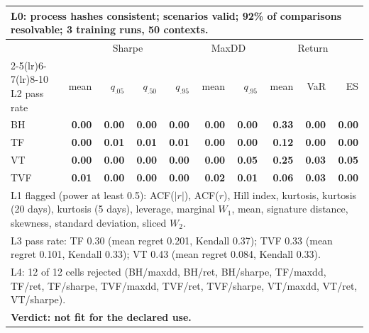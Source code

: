\begin{tabular}{lrrrrrrrrr}
\toprule
\multicolumn{10}{p{13.5cm}}{L0: process hashes consistent; scenarios valid; 92\% of comparisons resolvable; 3 training runs, 50 contexts.} \\
\midrule
 & \multicolumn{4}{c}{Sharpe} & \multicolumn{2}{c}{MaxDD} & \multicolumn{3}{c}{Return} \\
\cmidrule(lr){2-5}\cmidrule(lr){6-7}\cmidrule(lr){8-10}
L2 pass rate & mean & $q_{.05}$ & $q_{.50}$ & $q_{.95}$ & mean & $q_{.95}$ & mean & VaR & ES \\
\midrule
BH & \textbf{0.00} & \textbf{0.00} & \textbf{0.00} & \textbf{0.00} & \textbf{0.00} & \textbf{0.00} & \textbf{0.33} & \textbf{0.00} & \textbf{0.00} \\
TF & \textbf{0.00} & \textbf{0.01} & \textbf{0.01} & \textbf{0.01} & \textbf{0.00} & \textbf{0.00} & \textbf{0.12} & \textbf{0.00} & \textbf{0.00} \\
VT & \textbf{0.00} & \textbf{0.00} & \textbf{0.00} & \textbf{0.00} & \textbf{0.00} & \textbf{0.05} & \textbf{0.25} & \textbf{0.03} & \textbf{0.05} \\
TVF & \textbf{0.01} & \textbf{0.00} & \textbf{0.00} & \textbf{0.00} & \textbf{0.02} & \textbf{0.01} & \textbf{0.06} & \textbf{0.03} & \textbf{0.00} \\
\midrule
\multicolumn{10}{p{13.5cm}}{L1 flagged (power at least 0.5): ACF($|r|$), ACF($r$), Hill index, kurtosis, kurtosis (20 days), kurtosis (5 days), leverage, marginal $W_1$, mean, signature distance, skewness, standard deviation, sliced $W_2$.} \\
\multicolumn{10}{p{13.5cm}}{L3 pass rate: TF 0.30 (mean regret 0.201, Kendall 0.37); TVF 0.33 (mean regret 0.101, Kendall 0.33); VT 0.43 (mean regret 0.084, Kendall 0.33).} \\
\multicolumn{10}{p{13.5cm}}{L4: 12 of 12 cells rejected (BH/maxdd, BH/ret, BH/sharpe, TF/maxdd, TF/ret, TF/sharpe, TVF/maxdd, TVF/ret, TVF/sharpe, VT/maxdd, VT/ret, VT/sharpe).} \\
\multicolumn{10}{p{13.5cm}}{\textbf{Verdict: not fit for the declared use.}} \\
\bottomrule
\end{tabular}
